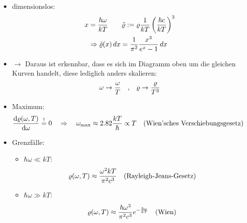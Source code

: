 \begin{center}
\end{center}
\begin{itemize}
\item dimensionslos:
\begin{align}
    x &= \frac{\hbar\omega}{kT} \qquad \Tilde{\varrho}:= \varrho \frac{1}{kT} \left(\frac{\hbar c}{kT}\right)^3\\
    &\Rightarrow \Tilde{\varrho}(x) \, dx = \frac{1}{\pi^2} \frac{x^3}{e^x-1} \, dx
\end{align}
\item[]$\rightarrow$ Daraus ist erkennbar, dass es sich im Diagramm oben um die gleichen Kurven handelt, diese lediglich anders skalieren:
\begin{equation*}
    \omega \rightarrow \frac{\omega}{T} \qq{,} \varrho \rightarrow \frac{\varrho}{T^3}
\end{equation*}
\item Maximum:
\begin{equation}
    \dv{\varrho(\omega,T)}{\omega}\stackrel{!}{=} 0 \quad \Rightarrow \quad \omega_{\text{max}} \approx 2.82 \frac{kT}{\hbar} \propto T \qq{(Wien'sches Verschiebungsgesetz)}
\end{equation}
\item Grenzfälle:
\begin{itemize}
    \item $\hbar\omega \ll kT$:
    \begin{equation}
        \varrho(\omega,T) \approx \frac{\omega^2kT}{\pi^2c^3} \qq{(Rayleigh-Jeans-Gesetz)}
    \end{equation}
    \item $\hbar\omega \gg kT$:
    \begin{equation}
        \varrho(\omega,T) \approx \frac{\hbar\omega^3}{\pi^2c^3} e^{-\frac{\hbar\omega}{kT}} \qq{(Wien)}
    \end{equation}
\end{itemize}
\end{itemize}

